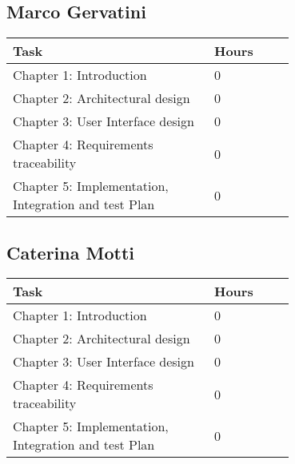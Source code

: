 \subsection{Marco Gervatini}
\begin{center}
	\begin{tabular}{@{}p{0.5\linewidth} p{0.2\linewidth}@{}}
		\hline
		\textbf{Task} & \textbf{Hours} \\ \hline
             Chapter 1: Introduction & 0 \\ \hline
             Chapter 2: Architectural design & 0 \\ \hline
             Chapter 3: User Interface design & 0 \\ \hline
             Chapter 4: Requirements traceability & 0 \\ \hline
             Chapter 5: Implementation, Integration
    and test Plan & 0 \\ \hline
	\end{tabular}
\end{center}

\subsection{Caterina Motti}
\begin{center}
	\begin{tabular}{@{}p{0.5\linewidth} p{0.2\linewidth}@{}}
		\hline
		\textbf{Task} & \textbf{Hours} \\ \hline
            Chapter 1: Introduction & 0 \\ \hline
            Chapter 2: Architectural design & 0 \\ \hline
            Chapter 3: User Interface design & 0 \\ \hline
            Chapter 4: Requirements traceability & 0 \\ \hline
            Chapter 5: Implementation, Integration
    and test Plan & 0 \\ \hline
	\end{tabular}
\end{center}